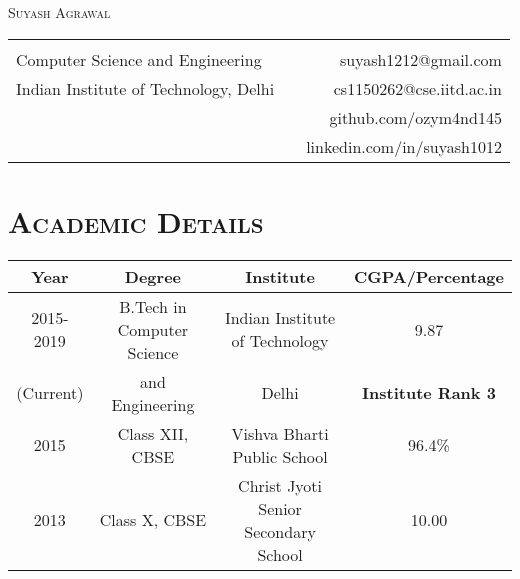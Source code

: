 \documentclass{article}
\newcommand{\tmpsection}[1]{}
\let\tmpsection=\section
\renewcommand{\section}[1]{\tmpsection*{\textsc{#1}}}
\begin{document}

\begin{center}
 {\Large \textsc{Suyash Agrawal} }\\ 
\begin{tabular}{ l p{8cm} r }
    & &   \\
  Computer Science and Engineering & & suyash1212@gmail.com \\
  Indian Institute of Technology, Delhi & & cs1150262@cse.iitd.ac.in \\
  & & github.com/ozym4nd145 \\ & & linkedin.com/in/suyash1012\\
\end{tabular}
\end{center}


\section{Academic Details}

\begin{center}
\begin{tabular}{ |c | c | c | c |}
\hline
Year & Degree & Institute & CGPA/Percentage \\ 
\hline
2015-2019 & B.Tech in Computer Science & Indian Institute of Technology & 9.87 \\ 
(Current) & and Engineering & Delhi & \textbf{Institute Rank 3}\\
\hline


2015 & Class XII, CBSE & Vishva Bharti Public School & 96.4\% \\ 

\hline
2013 & Class X, CBSE & Christ Jyoti Senior Secondary School & 10.00 \\  \hline
\end{tabular}
\end{center}
\end{document}
